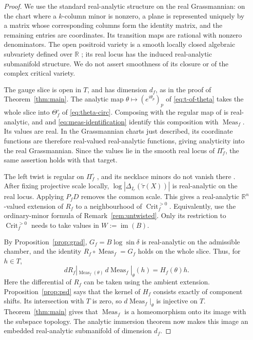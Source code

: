 \documentclass[11pt]{article}
\theoremstyle{definition}
\DeclareMathOperator{\Meas}{Meas}
\DeclareMathOperator{\Crit}{Crit}
\DeclareMathOperator{\im}{im}
\newcommand{\Critf}{\Crit_f^{>0}}
\begin{document}
\begin{proof}
We use the standard real-analytic structure on the real Grassmannian: on the
chart where a $k$-column minor is nonzero, a plane is represented uniquely by
a matrix whose corresponding columns form the identity matrix, and the
remaining entries are coordinates. Its transition maps are rational with
nonzero denominators. The open positroid variety is a smooth locally closed
algebraic subvariety defined over $\mathbb R$
\cite[Thm.~5.9]{KnutsonLamSpeyer}; its real locus has the induced
real-analytic submanifold structure. We do not assert smoothness of its
closure or of the complex critical variety.

The gauge slice is open in $T$, and has dimension $d_f$, as in the proof of
Theorem~\ref{thm:main}. The analytic map $\theta\mapsto(e^{i\theta_p})_p$
of \eqref{eq:t-of-theta} takes the whole slice into $\Theta_f^\circ$ of
\eqref{eq:theta-circ}. Composing with the regular map of
\cite[Prop.~5.1]{Galashin} is real-analytic, and
\cite[Lem.~5.13]{Galashin} and \eqref{eq:meas-identification} identify
this composition with $\Meas_f$. Its values are real. In the Grassmannian
charts just described, its coordinate functions are therefore real-valued
real-analytic functions, giving analyticity into the real Grassmannian.
Since the values lie in the smooth real locus of $\Pi_f^\circ$, the
same assertion holds with that target.

The left twist is regular on $\Pi_f^\circ$
\cite[\S5.4]{Galashin}, and its necklace minors do not vanish there
\cite[eq.~(2.4)]{Galashin}. After fixing projective scale locally,
$\log|\Delta_{I_r}(\widetilde\tau(X))|$ is real-analytic on the real
locus. Applying $P_fD$ removes the common scale. This gives a real-analytic
$\mathbb R^n$-valued extension of $R_f$ to a neighbourhood of $\Critf$.
Equivalently, use the ordinary-minor formula of Remark~\ref{rem:untwisted}.
Only its restriction to $\Critf$ needs to take values in $W:=\im(B)$.

By Proposition~\ref{prop:grad}, $G_f=B\log\sin\delta$ is real-analytic
on the admissible chamber, and the identity $R_f\circ\Meas_f=G_f$
holds on the whole slice. Thus, for $h\in T$,
\[
 dR_f|_{\Meas_f(\theta)}\,d\Meas_f|_\theta(h)=H_f(\theta)h.
\]
Here the differential of $R_f$ can be taken using the ambient extension.
Proposition~\ref{prop:psd} says that the kernel of $H_f$ consists exactly
of component shifts. Its intersection with $T$ is zero, so
$d\Meas_f|_\theta$ is injective on $T$. Theorem~\ref{thm:main} gives
that $\Meas_f$ is a homeomorphism onto its image with the subspace
topology. The analytic immersion theorem now makes this image an embedded
real-analytic submanifold of dimension $d_f$.


\end{proof}
\end{document}
